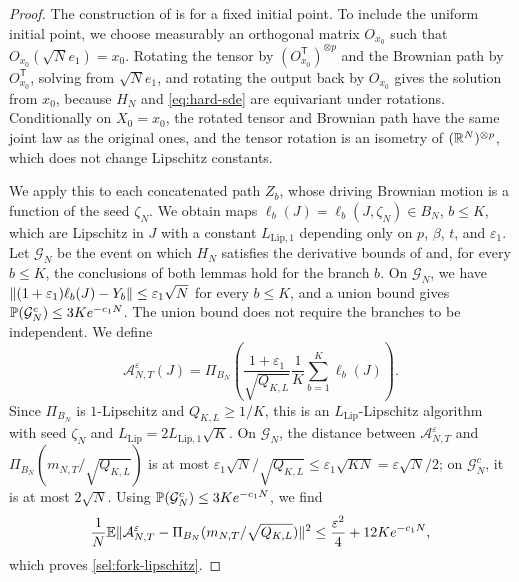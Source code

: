\begin{proof}
The construction of \cite{sellke2024} is for a fixed initial point. To
include the uniform initial point, we choose measurably an orthogonal matrix
$O_{x_0}$ such that $O_{x_0}(\sqrt N e_1)=x_0$. Rotating the tensor by
$(O_{x_0}^{\mathsf T})^{\otimes p}$ and the Brownian path by
$O_{x_0}^{\mathsf T}$, solving from $\sqrt Ne_1$, and rotating the output back
by $O_{x_0}$ gives the solution from $x_0$, because $H_N$ and
\eqref{eq:hard-sde} are equivariant under rotations. Conditionally on
$X_0=x_0$, the rotated tensor and Brownian path have the same joint law as
the original ones, and the tensor rotation is an isometry of
$(\mathbb R^N)^{\otimes p}$, which does not change Lipschitz constants.

We apply this to each concatenated path $Z_b$, whose driving Brownian
motion is a function of the seed $\zeta_N$. We obtain maps
$\ell_b(J)=\ell_b(J,\zeta_N)\in B_N$, $b\le K$, which are Lipschitz in $J$
with a constant $L_{\mathrm{Lip},1}$ depending only on $p$, $\beta$, $t$, and
$\varepsilon_1$. Let $\mathcal G_N$ be the event on which $H_N$ satisfies the
derivative bounds of \cite{sellke2024} and, for every $b\le K$, the
conclusions of both lemmas hold for the branch $b$. On $\mathcal G_N$, we
have $\lVert(1+\varepsilon_1)\ell_b(J)-Y_b\rVert\le\varepsilon_1\sqrt N$ for every
$b\le K$, and a union bound gives $\mathbb P(\mathcal G_N^c)\le3Ke^{-c_1N}$. The
union bound does not require the branches to be independent. We define
\begin{equation}\label{sel:fork-projected-algorithm}
 \mathcal A^\varepsilon_{N,T}(J)
 =\Pi_{B_N}\left(\frac{1+\varepsilon_1}{\sqrt{Q_{K,L}}}
 \frac1K\sum_{b=1}^K\ell_b(J)\right).
\end{equation}
Since $\Pi_{B_N}$ is $1$-Lipschitz and $Q_{K,L}\ge1/K$, this is an
$L_{\mathrm{Lip}}$-Lipschitz algorithm with seed $\zeta_N$ and
$L_{\mathrm{Lip}}=2L_{\mathrm{Lip},1}\sqrt K$. On $\mathcal G_N$, the distance between
$\mathcal A^\varepsilon_{N,T}$ and $\Pi_{B_N}(m_{N,T}/\sqrt{Q_{K,L}})$ is at
most $\varepsilon_1\sqrt N/\sqrt{Q_{K,L}}\le\varepsilon_1\sqrt{KN}
=\varepsilon\sqrt N/2$; on
$\mathcal G_N^c$, it is at most $2\sqrt N$. Using
$\mathbb P(\mathcal G_N^c)\le3Ke^{-c_1N}$, we find
\[
 \frac1N\mathbb E\lVert\mathcal A^\varepsilon_{N,T}
 -\Pi_{B_N}(m_{N,T}/\sqrt{Q_{K,L}})\rVert^2
 \le\frac{\varepsilon^2}4+12Ke^{-c_1N},
\]
which proves \eqref{sel:fork-lipschitz}.


\end{proof}
